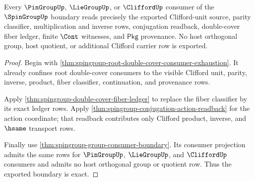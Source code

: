 \begin{theorem}
\label{thm:spingroup-boundary-consumer-exactness}
Every $\PinGroupUp$, $\LieGroupUp$, or $\CliffordUp$ consumer of the
$\SpinGroupUp$ boundary reads precisely the exported Clifford-unit source,
parity classifier, multiplication and inverse rows, conjugation readback,
double-cover fiber ledger, finite $\Cont$ witnesses, and $\mathsf{Pkg}$
provenance. No host orthogonal group, host quotient, or additional Clifford
carrier row is exported.
\end{theorem}
\begin{proof}
Begin with \autoref{thm:spingroup-root-double-cover-consumer-exhaustion}. It
already confines root double-cover consumers to the visible Clifford unit,
parity, inverse, product, fiber classifier, continuation, and provenance rows.

Apply \autoref{thm:spingroup-double-cover-fiber-ledger} to replace the fiber
classifier by its exact ledger rows. Apply
\autoref{thm:spingroup-conjugation-action-readback} for the action coordinate;
that readback contributes only Clifford product, inverse, and $\hsame$
transport rows.

Finally use \autoref{thm:spingroup-group-consumer-boundary}. Its consumer
projection admits the same rows for $\PinGroupUp$, $\LieGroupUp$, and
$\CliffordUp$ consumers and admits no host orthogonal group or quotient row.
Thus the exported boundary is exact.
\end{proof}

